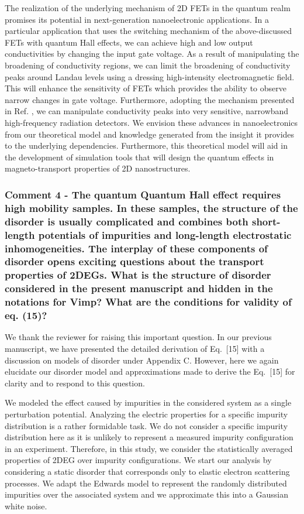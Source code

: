 \documentclass{article}
\begin{document}
\begin{itemize}
{  The realization of the underlying mechanism of 2D FETs in the quantum realm promises its potential in next-generation nanoelectronic applications. In a particular application that uses the switching mechanism of the above-discussed FETs with quantum Hall effects, we can achieve high and low output conductivities by changing the input gate voltage. As a result of manipulating the broadening of conductivity regions, we can limit the broadening of conductivity peaks around Landau levels using a dressing high-intensity electromagnetic field. This will enhance the sensitivity of FETs which provides the ability to observe narrow changes in gate voltage.
  Furthermore, adopting the mechanism presented in Ref. \cite{hirakawa01}, we can manipulate conductivity peaks into very sensitive, narrowband high-frequency radiation detectors.
  We envision these advances in nanoelectronics from our theoretical model and knowledge generated from the insight it provides to the underlying dependencies.
  Furthermore, this theoretical model will aid in the development of simulation tools that will design the quantum effects in
  magneto-transport properties of 2D nanostructures.
  }
\end{itemize}

\subsubsection*{Comment 4 -
\color{RoyalBlue} The quantum Quantum Hall effect requires high mobility samples. In these samples, the structure of the disorder is usually complicated and combines both short-length potentials of impurities and long-length electrostatic inhomogeneities. The interplay of these components of disorder opens exciting questions about the transport properties of 2DEGs. What is the structure of disorder considered in the present manuscript and hidden in the notations for Vimp? What are the conditions for validity of eq. (15)?
}

We thank the reviewer for raising this important question. In our previous manuscript, we have presented the detailed derivation of Eq.~[15] with a discussion on models of disorder under Appendix C. However, here we again elucidate our disorder model and approximations made to derive the Eq.~[15] for clarity and to respond to this question.

We modeled the effect caused by impurities in the considered system as a single perturbation potential. Analyzing the electric properties for a specific impurity distribution is a rather formidable task. We do not consider a specific impurity distribution here as it is unlikely to represent a measured impurity configuration in an experiment. Therefore, in this study, we consider the statistically averaged properties of 2DEG over impurity configurations.
We start our analysis by considering a static disorder that corresponds only to elastic electron scattering processes.
We adapt the Edwards model \cite{akkermans10} to represent the randomly distributed impurities over the associated system and we approximate this into a Gaussian white noise.
\end{document}
